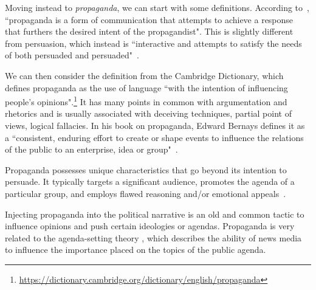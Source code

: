 Moving instead to \emph{propaganda}, we can start with some definitions.
According to~\citet{jowett2012propaganda}, ``propaganda  is  a  form  of  communication  that  attempts  to  achieve a  response  that  furthers  the  desired  intent  of  the  propagandist". This is slightly different from persuasion, which instead is ``interactive and attempts to satisfy the needs of both persuaded and persuaded"~\citep{jowett2018propaganda}.






We can then consider the definition from the Cambridge Dictionary, which defines propaganda as the use of language ``with the intention of influencing people's opinions".\footnote{\url{https://dictionary.cambridge.org/dictionary/english/propaganda}}
It has many points in common with argumentation and rhetorics and is usually associated with deceiving techniques, partial point of views, logical fallacies.
In his book on propaganda, Edward Bernays defines it as a ``consistent, enduring effort to create or shape events to influence the relations of the public to an enterprise, idea or group"~\citep{bernays}.

Propaganda possesses unique characteristics that go beyond its intention to persuade. It typically targets a significant audience, promotes the agenda of a particular group, and employs flawed reasoning and/or emotional appeals~\citep{miller1939techniques}.

Injecting propaganda into the political narrative is an old and common tactic to influence opinions and push certain ideologies or agendas.
Propaganda is very related to the agenda-setting theory \citep{Cohen_1964,mccombs1972agenda}, which describes the ability of news media to influence the importance placed on the topics of the public agenda.

